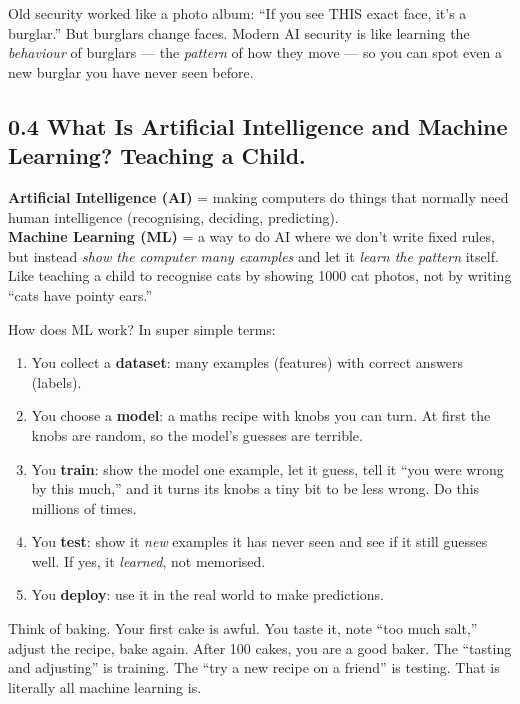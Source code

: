 \documentclass[11pt,a4paper]{article}
\begin{document}
Old security worked like a photo album: ``If you see THIS exact face, it's a
burglar.'' But burglars change faces. Modern AI security is like learning the
\emph{behaviour} of burglars --- the \emph{pattern} of how they move --- so
you can spot even a new burglar you have never seen before.

\subsection{0.4 What Is Artificial Intelligence and Machine Learning? Teaching a Child.}

\begin{jargonbox}
\textbf{Artificial Intelligence (AI)} = making computers do things that normally
need human intelligence (recognising, deciding, predicting).\\[2pt]
\textbf{Machine Learning (ML)} = a way to do AI where we don't write fixed
rules, but instead \emph{show the computer many examples} and let it \emph{learn
the pattern} itself. Like teaching a child to recognise cats by showing 1000
cat photos, not by writing ``cats have pointy ears.''
\end{jargonbox}

How does ML work? In super simple terms:

\begin{enumerate}[leftmargin=1.8em,itemsep=2pt]
  \item You collect a \textbf{dataset}: many examples (features) with correct
        answers (labels).
  \item You choose a \textbf{model}: a maths recipe with knobs you can turn.
        At first the knobs are random, so the model's guesses are terrible.
  \item You \textbf{train}: show the model one example, let it guess, tell it
        ``you were wrong by this much,'' and it turns its knobs a tiny bit to
        be less wrong. Do this millions of times.
  \item You \textbf{test}: show it \emph{new} examples it has never seen and
        see if it still guesses well. If yes, it \emph{learned}, not memorised.
  \item You \textbf{deploy}: use it in the real world to make predictions.
\end{enumerate}

\begin{imaginebox}
Think of baking. Your first cake is awful. You taste it, note ``too much
salt,'' adjust the recipe, bake again. After 100 cakes, you are a good baker.
The ``tasting and adjusting'' is training. The ``try a new recipe on a friend''
is testing. That is literally all machine learning is.
\end{imaginebox}
\end{document}
